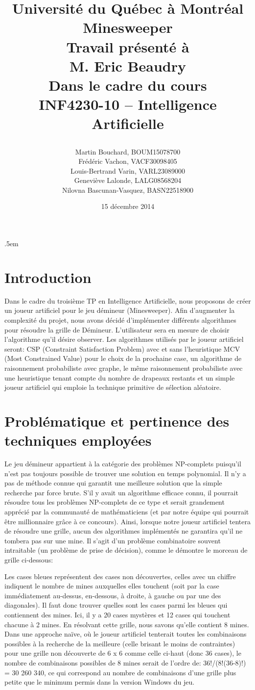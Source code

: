 \documentclass{article}
\title{%
\Large{Université du Québec à Montréal}\\
\vspace{2.5cm}
\Huge{Minesweeper}\\
\vspace{3cm}
\Large{Travail présenté à \\M. Eric Beaudry} \\
\vspace{2cm}
\Large{Dans le cadre du cours \\INF4230-10 – Intelligence Artificielle} \\
\vspace{1cm}
\author{Martin Bouchard, BOUM15078700\\Frédéric Vachon, VACF30098405\\Louis-Bertrand Varin,
VARL23089000\\Geneviève Lalonde, LALG08568204\\Nilovna Bascunan-Vasquez, BASN22518900}
\date{\vspace{0.5cm} 15 décembre 2014}
\vfill
}
\begin{document}
\maketitle

\thispagestyle{empty}
\clearpage

\openup .5em

\section{Introduction}
Dans le cadre du troisième TP en Intelligence Artificielle, nous proposons de créer un joueur
artificiel pour le jeu démineur (Minesweeper). Afin d’augmenter la complexité du projet, nous avons
décidé d’implémenter différents algorithmes pour résoudre la grille de Démineur. L’utilisateur sera
en mesure de choisir l’algorithme qu’il désire observer. Les algorithmes utilisés par le joueur
artificiel seront: CSP (Constraint Satisfaction Problem) avec et sans l’heuristique MCV (Most
Constrained Value) pour le choix de la prochaine case, un algorithme de raisonnement probabiliste
avec graphe, le même raisonnement probabiliste avec une heuristique tenant compte du nombre de
drapeaux restants et un simple joueur artificiel qui emploie la technique primitive de sélection
aléatoire.

\section{Problématique et pertinence des techniques employées}
Le jeu démineur appartient à la catégorie des problèmes NP-complets puisqu’il n’est pas toujours
possible de trouver une solution en temps polynomial. Il n’y a pas de méthode connue qui garantit
une meilleure solution que la simple recherche par force brute. S’il y avait un algorithme efficace
connu, il pourrait résoudre tous les problèmes NP-complets de ce type et serait grandement apprécié
par la communauté de mathématiciens (et par notre équipe qui pourrait être millionnaire grâce à ce
concours). Ainsi, lorsque notre joueur artificiel tentera de résoudre une grille, aucun des
algorithmes implémentés ne garantira qu’il ne tombera pas sur une mine. Il s’agit d’un problème
combinatoire souvent intraitable (un problème de prise de décision), comme le démontre le morceau de
grille ci-dessous:

Les cases bleues représentent des cases non découvertes, celles avec un chiffre indiquent le nombre
de mines auxquelles elles touchent (soit par la case immédiatement au-dessus, en-dessous, à droite,
à gauche ou par une des diagonales). Il faut donc trouver quelles sont les cases parmi les bleues
qui contiennent des mines. Ici, il y a 20 cases mystères et 12 cases qui touchent chacune à 2 mines.
En résolvant cette grille, nous savons qu’elle contient 8 mines. Dans une approche naïve, où le
joueur artificiel tenterait toutes les combinaisons possibles à la recherche de la meilleure (celle
brisant le moins de contraintes) pour une grille non découverte de 6 x 6 comme celle ci-haut (donc
36 cases), le nombre de combinaisons possibles de 8 mines serait de l’ordre de:
36!/(8!(36-8)!) = 30 260 340, ce qui correspond au nombre de combinaisons d’une grille plus petite
que le minimum permis dans la version Windows du jeu.
\end{document}
